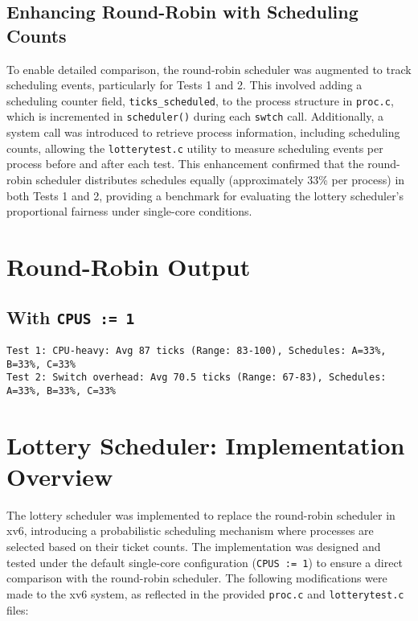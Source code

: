 \documentclass{article}
\begin{document}
\subsection{Enhancing Round-Robin with Scheduling Counts}
To enable detailed comparison, the round-robin scheduler was augmented to track scheduling events, particularly for Tests 1 and 2. This involved adding a scheduling counter field, \texttt{ticks\_scheduled}, to the process structure in \texttt{proc.c}, which is incremented in \texttt{scheduler()} during each \texttt{swtch} call. Additionally, a system call was introduced to retrieve process information, including scheduling counts, allowing the \texttt{lotterytest.c} utility to measure scheduling events per process before and after each test. This enhancement confirmed that the round-robin scheduler distributes schedules equally (approximately 33\% per process) in both Tests 1 and 2, providing a benchmark for evaluating the lottery scheduler’s proportional fairness under single-core conditions.

\section{Round-Robin Output}
\subsection{With \texttt{CPUS := 1}}
\begin{lstlisting}[breaklines=true]
Test 1: CPU-heavy: Avg 87 ticks (Range: 83-100), Schedules: A=33%, B=33%, C=33%
Test 2: Switch overhead: Avg 70.5 ticks (Range: 67-83), Schedules: A=33%, B=33%, C=33%
\end{lstlisting}

\section{Lottery Scheduler: Implementation Overview}
The lottery scheduler was implemented to replace the round-robin scheduler in xv6, introducing a probabilistic scheduling mechanism where processes are selected based on their ticket counts. The implementation was designed and tested under the default single-core configuration (\texttt{CPUS := 1}) to ensure a direct comparison with the round-robin scheduler. The following modifications were made to the xv6 system, as reflected in the provided \texttt{proc.c} and \texttt{lotterytest.c} files:
\end{document}
